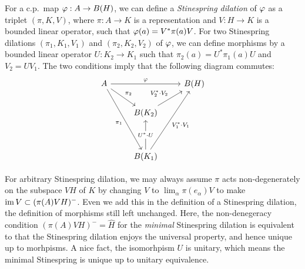 \documentclass{../../../small}
\begin{document}
\begin{rmk*}
For a c.p.~map $\varphi:A\to B(H)$, we can define a \emph{Stinespring dilation} of $\varphi$ as a triplet $(\pi,K,V)$, where $\pi:A\to K$ is a representation and $V:H\to K$ is a bounded linear operator, such that $\varphi(a)=V^*\pi(a)V$.
For two Stinespring dilations $(\pi_1,K_1,V_1)$ and $(\pi_2,K_2,V_2)$ of $\varphi$, we can define morphisms by a bounded linear operator $U:K_2\to K_1$ such that $\pi_2(a)=U^*\pi_1(a)U$ and $V_2=UV_1$.
The two conditions imply that the following diagram commutes:
\[\begin{tikzcd}
 A\ar{rr}{\f}\ar{dr}{\pi_2}\ar[swap]{dddr}{\pi_1}&&B(H)\\
&B(K_2)\ar{ur}{V_2^*\cdot V_2}&\\
&&\\
&B(K_1)\ar[swap]{uuur}{V_1^*\cdot V_1}\ar{uu}[description]{U^*\cdot U}&
\end{tikzcd}\]

For arbitrary Stinespring dilation, we may always assume $\pi$ acts non-degenerately on the subspace $VH$ of $K$ by changing $V$ to $\lim_\alpha\pi(e_\alpha)V$ to make $\operatorname{im} V\subset(\pi(A)VH)^-$.
Even we add this in the definition of a Stinespring dilation, the definition of morphisms still left unchanged.
Here, the non-denegeracy condition $(\pi(A)VH)^-=\hat H$ for the \emph{minimal} Stinespring dilation is equivalent to that the Stinespring dilation enjoys the universal property, and hence unique up to morhpisms.
A nice fact, the isomorhpism $U$ is unitary, which means the minimal Stinespring is unique up to unitary equivalence.
\end{rmk*}
\end{document}
